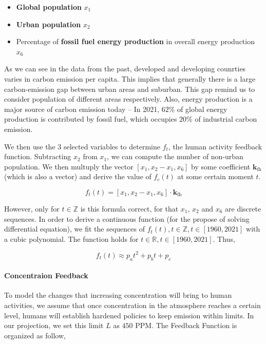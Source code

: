 \documentclass[12pt]{article}
\begin{document}
\begin{itemize}
    \item \textbf{Global population} $x_1$
    \item \textbf{Urban population} $x_2$
    \item Percentage of \textbf{fossil fuel energy production} in overall energy production $x_6$
\end{itemize}

As we can see in the data from the past, developed and developing counrties varies in carbon emission per capita. This implies that generally there is a large carbon-emission gap between urban areas and suburban. This gap remind us to consider population of different areas respectively. 
Also, energy production is a major source of carbon emission today -- In 2021, $62\%$ of global energy production is contributed by fossil fuel, which occupies $20\%$ of industrial carbon emission. 

We then use the 3 selected variables to determine $f_t$, the human activity feedback function. Subtracting $x_2$ from $x_1$, we can compute the number of non-urban population. We then multuply the vector $[x_1, x_2 - x_1, x_6]$ by some coefficient ${\boldsymbol{k}_\text{fh}}$ (which is also a vector) and derive the value of $f_c(t)$ at some certain moment $t$.

\begin{equation}
\label{ODE:ft}
f_t(t) = [x_1, x_2 - x_1, x_6] \cdot {\boldsymbol{k}_\text{fh}}
\end{equation}

However, only for $t \in \mathbb{Z}$ is this formula correct, for that $x_1$, $x_2$ and $x_6$ are discrete sequences. In order to derive a continuous function (for the propose of solving differential equation), we fit the sequences of $f_t(t), t \in \mathbb{Z}, t \in [1960, 2021]$ with a cubic polynomial. The function holds for $t \in \mathbb{R}, t \in [1960, 2021]$. Thus, 

\begin{equation}
    \label{ODE:ft2}
    f_t(t) \approx p_a t^2 + p_b t + p_c
\end{equation}

\paragraph{ Concentraion Feedback}
To model the changes that increasing  concentration will bring to human activities, we assume that once  concentration in the atmosphere reaches a certain level, humans will establish hardened policies to keep  emission within limits. In our projection, we set this limit $L$ as $450$ PPM\cite{ref450}. The  Feedback Function is organized as follow, 
\end{document}

